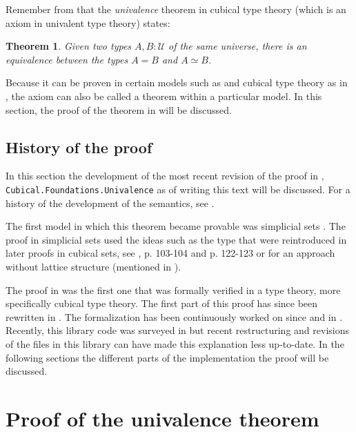 \documentclass[12pt,a4paper,twoside,xetex]{book} %
\newcommand{\keyword}[1]{\emph{#1}\index{#1}}
\newtheorem{theorem}{Theorem}[section]
\begin{document}
Remember from  that the \keyword{univalence} theorem in cubical 
type theory (which is an axiom in univalent type theory) states:

\begin{theorem}
 Given two types $A, B : \mathcal{U}$ of the same universe, there is an 
equivalence between the types $A = B$ and $A \simeq B$.
 \end{theorem}

Because it can be proven in certain models such as \cite{Kapulkin2012} and 
cubical type theory as in , the axiom can also be called a theorem 
within a particular model. In this section, the proof of the theorem in 
\cite{Moertberg2018} will be discussed.

\subsection{History of the proof}

In this section the development of the most recent revision of the proof in  \cite{Moertberg2018}, \texttt{Cubical.Foundations.Univalence} as of writing this 
text will be discussed. For a history of the development of the semantics, see .

The first model in which this theorem became provable was simplicial sets 
\cite{Kapulkin2012}. The proof in simplicial sets used the ideas such as the 
 type that were reintroduced in later proofs in cubical sets, see 
\cite{Huber2016}, p. 103-104 and p. 122-123 or \cite{Bezem2018} for an approach 
without lattice structure (mentioned in ). 

The proof in \cite{Huber2016} was the first one that was formally verified in a 
type theory, more specifically cubical type theory. The first part of this proof has since been rewritten 
in \cite{Weinberger2016}. The formalization has been continuously worked on 
since \cite{Moertberg2015} and \cite{Cohen2016} in \cite{Moertberg2018}. Recently, this library code was surveyed in \cite{Moertberg2018a} but recent restructuring and revisions of the files in this library can have made this explanation less up-to-date. In the following sections the different parts of the implementation the proof will be discussed.

\section{Proof of the univalence theorem}
\end{document}
